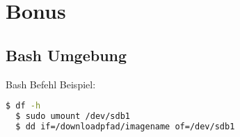 \chapter{Bonus}

\section{Bash Umgebung}

\noindent Bash Befehl Beispiel:
\begin{lstlisting}[language=bash]
  $ df -h
  $ sudo umount /dev/sdb1
  $ dd if=/downloadpfad/imagename of=/dev/sdb1
\end{lstlisting}

